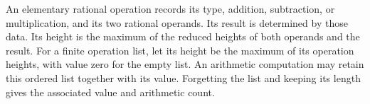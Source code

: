 \begin{definition}
    \label{def:lvv_rational_operation_records}
    \leanok
    An elementary rational operation records its type, addition,
    subtraction, or multiplication, and its two rational operands.
    Its result is determined by those data. Its height is the maximum
    of the reduced heights of both operands and the result. For a
    finite operation list, let its height be the maximum of its
    operation heights, with value zero for the empty list.
    An arithmetic computation may retain this ordered list together
    with its value. Forgetting the list and keeping its length gives
    the associated value and arithmetic count.
\end{definition}

